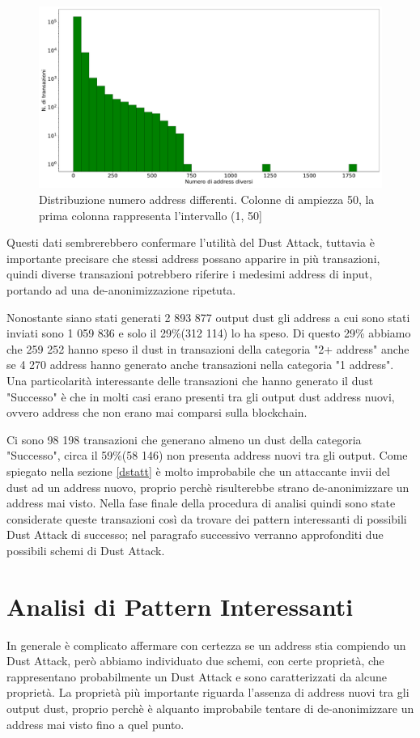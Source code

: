  \begin{figure}[h!]
     \centering
     \includegraphics[scale=0.3]{Grafici/num_addr.pdf}
     \caption{Distribuzione numero address differenti. Colonne di ampiezza 50, la prima colonna rappresenta l'intervallo (1, 50]}
     \label{fig:diff_addr}
 \end{figure}
\FloatBarrier
Questi dati sembrerebbero confermare l'utilità del Dust Attack, tuttavia è importante precisare che stessi address possano apparire in più transazioni, quindi diverse transazioni potrebbero riferire i medesimi address di input, portando ad una de-anonimizzazione ripetuta. 

Nonostante siano stati generati 2 893 877 output dust gli address a cui sono stati inviati sono 1 059 836 e solo il 29\%(312 114) lo ha speso. Di questo 29\% abbiamo che 259 252 hanno speso il dust in transazioni della categoria "2+ address" anche se 4 270 address hanno generato anche transazioni nella categoria "1 address". Una particolarità interessante delle transazioni che hanno generato il dust "Successo" è che in molti casi erano presenti tra gli output dust address nuovi, ovvero address che non erano mai comparsi sulla blockchain. 

Ci sono 98 198 transazioni che generano almeno un dust della categoria "Successo", circa il 59\%(58 146) non presenta address nuovi tra gli output. Come spiegato nella sezione \ref{dstatt} è molto improbabile che un attaccante invii del dust ad un address nuovo, proprio perchè risulterebbe strano de-anonimizzare un address mai visto. Nella fase finale della procedura di analisi quindi sono state considerate queste transazioni così da trovare dei pattern interessanti di possibili Dust Attack di successo; nel paragrafo successivo verranno approfonditi due possibili schemi di Dust Attack.  
\section{Analisi di Pattern Interessanti}\label{pattern}
In generale è complicato affermare con certezza se un address stia compiendo un Dust Attack, però abbiamo individuato due schemi, con certe proprietà, che rappresentano probabilmente un Dust Attack e sono caratterizzati da alcune proprietà. La proprietà più importante riguarda l'assenza di address nuovi tra gli output dust, proprio perchè è alquanto improbabile tentare di de-anonimizzare un address mai visto fino a quel punto.

